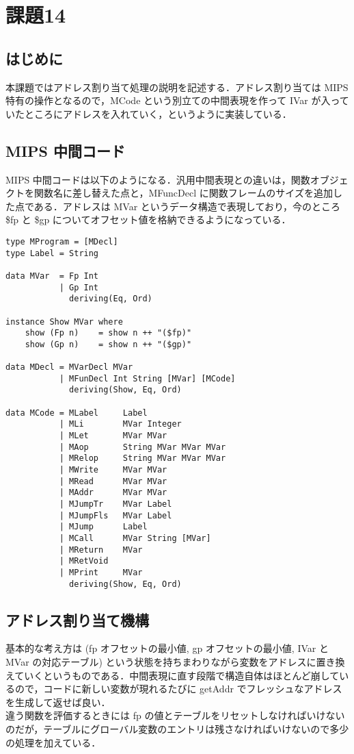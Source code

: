 \documentclass{jsarticle}
\begin{document}
\section{課題14}
\subsection{はじめに}
本課題ではアドレス割り当て処理の説明を記述する．アドレス割り当ては MIPS 特有の操作となるので，MCode という別立ての中間表現を作って IVar が入っていたところにアドレスを入れていく，というように実装している．

\subsection{MIPS 中間コード}
MIPS 中間コードは以下のようになる．汎用中間表現との違いは，関数オブジェクトを関数名に差し替えた点と，MFuncDecl に関数フレームのサイズを追加した点である．アドレスは MVar というデータ構造で表現しており，今のところ \$fp と \$gp についてオフセット値を格納できるようになっている．
\begin{verbatim}
type MProgram = [MDecl]
type Label = String

data MVar  = Fp Int
           | Gp Int
             deriving(Eq, Ord)

instance Show MVar where
    show (Fp n)    = show n ++ "($fp)"
    show (Gp n)    = show n ++ "($gp)"

data MDecl = MVarDecl MVar
           | MFunDecl Int String [MVar] [MCode]
             deriving(Show, Eq, Ord)

data MCode = MLabel     Label
           | MLi        MVar Integer
           | MLet       MVar MVar
           | MAop       String MVar MVar MVar
           | MRelop     String MVar MVar MVar
           | MWrite     MVar MVar
           | MRead      MVar MVar
           | MAddr      MVar MVar
           | MJumpTr    MVar Label
           | MJumpFls   MVar Label
           | MJump      Label
           | MCall      MVar String [MVar]
           | MReturn    MVar
           | MRetVoid
           | MPrint     MVar
             deriving(Show, Eq, Ord)
\end{verbatim}

\subsection{アドレス割り当て機構}
基本的な考え方は (fp オフセットの最小値, gp オフセットの最小値, IVar と MVar の対応テーブル) という状態を持ちまわりながら変数をアドレスに置き換えていくというものである．中間表現に直す段階で構造自体はほとんど崩しているので，コードに新しい変数が現れるたびに getAddr でフレッシュなアドレスを生成して返せば良い．\\
違う関数を評価するときには fp の値とテーブルをリセットしなければいけないのだが，テーブルにグローバル変数のエントリは残さなければいけないので多少の処理を加えている．
\end{document}
